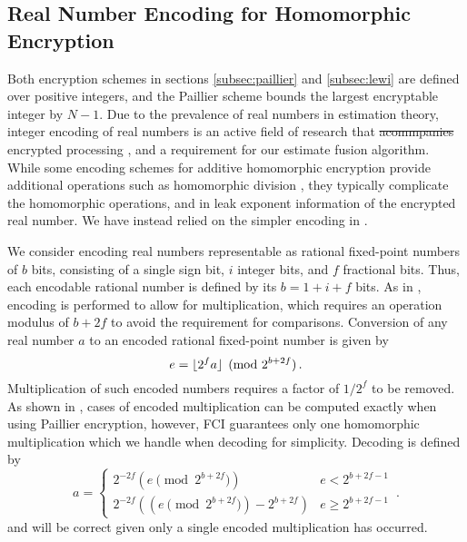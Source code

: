 \documentclass[letterpaper, 10 pt, journal, twoside]{ieeetran}  %
\providecommand{\DIFadd}[1]{{\protect\color{blue}\uwave{#1}}} %
\providecommand{\DIFdel}[1]{{\protect\color{red}\sout{#1}}}                      %
\providecommand{\DIFaddbegin}{} %
\providecommand{\DIFaddend}{} %
\providecommand{\DIFdelbegin}{} %
\providecommand{\DIFdelend}{} %
\begin{document}
\subsection{Real Number Encoding for Homomorphic Encryption} \label{subsec:encoding}
Both encryption schemes in sections \ref{subsec:paillier} and \ref{subsec:lewi} are defined over positive integers, and the Paillier scheme bounds the largest encryptable integer by $N-1$. Due to the prevalence of real numbers in estimation theory, integer encoding of real numbers is an active field of research that \DIFdelbegin \DIFdel{acommpanies }\DIFdelend \DIFaddbegin \DIFadd{accompanies }\DIFaddend encrypted processing \cite{ziadCryptoImgPrivacyPreserving2016,farokhiSecurePrivateControl2017,cheonHomomorphicEncryptionArithmetic2017}, and a requirement for our estimate fusion algorithm. While some encoding schemes for additive homomorphic encryption provide additional operations such as homomorphic division \cite{ziadCryptoImgPrivacyPreserving2016}, they typically complicate the homomorphic operations, and in \cite{ziadCryptoImgPrivacyPreserving2016} leak exponent information of the encrypted real number. We have instead relied on the simpler encoding in \cite{farokhiSecurePrivateControl2017}. 

We consider encoding real numbers representable as rational fixed-point numbers of $b$ bits, consisting of a single sign bit, $i$ integer bits, and $f$ fractional bits. Thus, each encodable rational number is defined by its $b=1+i+f$ bits. As in \cite{farokhiSecurePrivateControl2017}, encoding is performed to allow for multiplication, which requires an operation modulus of $b+2f$ to avoid the requirement for comparisons. Conversion of any real number $a$ to an encoded rational fixed-point number is given by
\begin{equation}
   e = \lfloor{2^f a}\rfloor\pmod{2^{b + 2f}}\,. \label{eqn:qmn}
\end{equation}
Multiplication of such encoded numbers requires a factor of $1/2^f$ to be removed. As shown in \cite{farokhiSecurePrivateControl2017}, cases of encoded multiplication can be computed exactly when using Paillier encryption, however, FCI guarantees only one homomorphic multiplication which we handle when decoding for simplicity. Decoding is defined by
\begin{equation}
   a=
   \begin{cases}
      2^{-2f}\left(e \!\!\pmod{2^{b+2f}}\right) & e<2^{b+2f-1} \\
      2^{-2f}\left((e \!\!\pmod{2^{b+2f}}) - 2^{b+2f}\right) & e\geq 2^{b+2f-1}
   \end{cases}\,. \label{eqn:qmn_mult_decode}
\end{equation}
and will be correct given only a single encoded multiplication has occurred.
\end{document}
